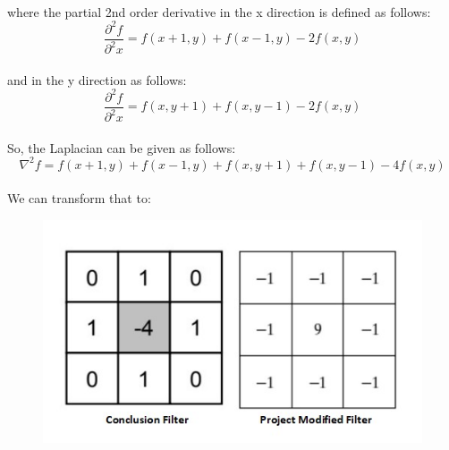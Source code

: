 \paragraph{}
where the partial 2nd order derivative in the x direction is defined as follows:\newline
\[\frac{\partial^{2}f}{\partial^{2}x} = f(x+1, y) + f(x-1, y) - 2f(x, y)\]

\paragraph{}
and in the y direction as follows:\newline
\[\frac{\partial^{2}f}{\partial^{2}x} = f(x, y+1) + f(x, y-1) - 2f(x, y)\]

\paragraph{}
So, the Laplacian can be given as follows:\newline
\[\nabla^{2} f = f(x+1, y) + f(x-1, y) + f(x, y+1) + f(x, y-1) - 4f(x, y)\]

\paragraph{}
We can transform that to:\newline
\begin{figure}[H]
	\centering
	\includegraphics[width=\linewidth]{filters.jpg}
\end{figure}

